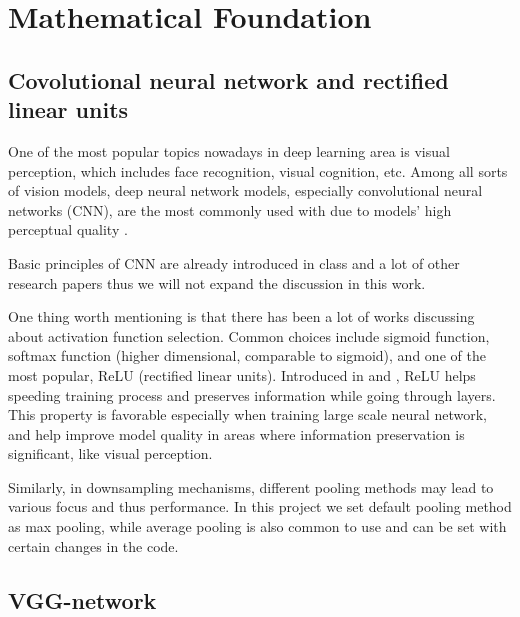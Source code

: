
\chapter{Mathematical Foundation}
\label{chap:foundation}


\section{Covolutional neural network and rectified linear units}
\label{sec:foundation:cnn}

One of the most popular topics nowadays in deep learning area is visual perception,
which includes face recognition, visual cognition, etc.
Among all sorts of vision models, deep neural network models,
especially convolutional neural networks (CNN),
are the most commonly used with due to models' high perceptual quality \cite{Gatys:2015ub, Russakovsky:2015hb, taigman2014deepface}.

Basic principles of CNN are already introduced in class and a lot of other research papers
thus we will not expand the discussion in this work.

One thing worth mentioning is that there has been a lot of works discussing about activation function selection.
Common choices include sigmoid function, softmax function (higher dimensional, comparable to sigmoid),
and one of the most popular, ReLU (rectified linear units).
Introduced in \cite{nair2010rectified} and \cite{krizhevsky2012imagenet}, ReLU helps speeding training process and
preserves information while going through layers.
This property is favorable especially when training large scale neural network,
and help improve model quality in areas where information preservation is significant, like visual perception.

Similarly, in downsampling mechanisms, different pooling methods may lead to various focus and thus performance.
In this project we set default pooling method as max pooling,
while average pooling is also common to use and can be set with certain changes in the code.



\section{VGG-network}
\label{sec:foundation:vgg}


